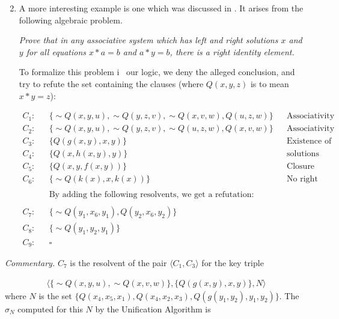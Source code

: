 \documentclass[8pt]{extarticle}
\begin{document}
\begin{enumerate}[label=Example \arabic*.]
    \setcounter{enumi}{1}
    \item A more interesting example is one which was discussed in \cite{robinson_1963}. It arises from the following algebraic problem.
    
    \emph{Prove that in any associative system which has left and right solutions $x$ and $y$ for all equations $x*a = b$ and $a * y = b$, there is a right identity element.}
    
    To formalize this problem i~ our logic, we deny the alleged conclusion, and try to refute the set containing the clauses (where $Q(x,y,z)$ is to mean $x*y = z$):
    
    \begin{align*}
        C_1 : && \{\sim Q(x,y,u), \sim Q(y,z,v), \sim Q(x,v,w), Q(u,z,w)\} && \text{Associativity} \\
        C_2 : && \{\sim Q(x,y,u), \sim Q(y,z,v), \sim Q(u,z,w), Q(x,v,w)\} && \text{Associativity} \\
        C_3 : && \{Q(g(x,y),x,y)\} && \text{Existence of left and right} \\
        C_4 : && \{Q(x, h(x,y), y)\} && \text{solutions} \\
        C_5 : && \{Q(x,y, f(x,y))\} && \text{Closure under *} \\
        C_6 : && \{\sim Q(k(x), x, k(x))\} && \text{No right identity.} \\ \\
        && \text{By adding the following resolvents, we get a refutation:} && \\ \\
        C_7 : && \{\sim Q(y_1, x_6, y_1), Q(y_2, x_6, y_2)\} && \\
        C_8 : && \{\sim Q(y_1, y_2, y_1)\} && \\
        C_9 : && \square &&
    \end{align*}
\end{enumerate}

\emph{Commentary.} $C_7$ is the resolvent of the pair $\langle C_1, C_3\rangle$ for the key triple

\begin{align*}
    \langle\{\sim Q(x,y,u), \sim Q(x,v,w)\}, \{ Q(g(x,y), x, y)\}, N\rangle
\end{align*}
\noindent
where $N$ is the set $\{Q(x_4, x_5, x_1), Q(x_4,x_2,x_3), Q(g(y_1,y_2),y_1,y_2)\}.$ The $\sigma_N$ computed for this $N$ by the Unification Algorithm is
\end{document}
